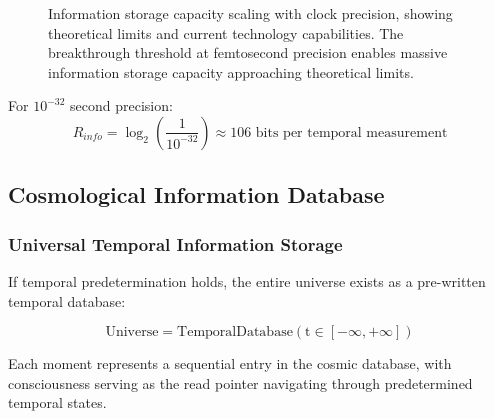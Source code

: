 \documentclass[12pt,a4paper]{article}
\begin{document}
{\begin{figure}[H]
\caption{Information storage capacity scaling with clock precision, showing theoretical limits and current technology capabilities. The breakthrough threshold at femtosecond precision enables massive information storage capacity approaching theoretical limits.}
\label{fig:clock_precision_capacity}
\end{figure}

For $10^{-32}$ second precision:
$$R_{info} = \log_2\left(\frac{1}{10^{-32}}\right) \approx 106 \text{ bits per temporal measurement}$$

\subsection{Cosmological Information Database}

\subsubsection{Universal Temporal Information Storage}

If temporal predetermination holds, the entire universe exists as a pre-written temporal database:

\begin{equation}
\text{Universe} = \text{TemporalDatabase}(\text{t} \in [-\infty, +\infty])
\end{equation}

Each moment represents a sequential entry in the cosmic database, with consciousness serving as the read pointer navigating through predetermined temporal states.

}
\end{document}
